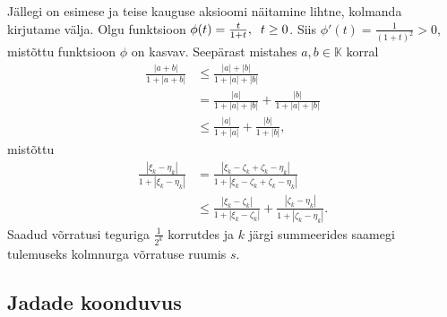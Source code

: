 \documentclass{article}[12pt]
\newcommand{\h}{\hspace{0.2cm}}
\newcommand{\K}{\mathbb{K}}
\theoremstyle{definition}
\theoremstyle{definition}
\theoremstyle{definition}
\theoremstyle{break}
\begin{document}
\begin{enumerate}
	Jällegi on esimese ja teise kauguse aksioomi näitamine lihtne, kolmanda kirjutame välja.
	Olgu funktsioon $\phi(t) = \frac{t}{1+t},\h t\geq 0$. Siis $\phi'(t) = \frac{1}{(1+t)^2}>0$, mistõttu funktsioon $\phi$ on kasvav. 
	Seepärast mistahes $a,b\in\K$ korral
	\begin{align*}
		\frac{ |a+b| }{ 1+|a+b| } &\leq \frac{ |a|+|b| }{ 1+|a|+|b| } \\
		&= \frac{ |a| }{ 1+|a|+|b| } + \frac{ |b| }{ 1+|a|+|b| } \\
		&\leq \frac{ |a| }{ 1+|a| } + \frac{ |b| }{ 1+|b| },
	\end{align*}
	mistõttu
	\begin{align*}
		\frac{ |\xi_k-\eta_k| }{ 1+|\xi_k-\eta_k| } &= \frac{ |\xi_k-\zeta_k+\zeta_k-\eta_k| }{ 1+|\xi_k-\zeta_k+\zeta_k-\eta_k| } \\
		&\leq \frac{ |\xi_k-\zeta_k| }{ 1+|\xi_k-\zeta_k| } + \frac{ |\zeta_k-\eta_k| }{ 1+|\zeta_k-\eta_k| }.
	\end{align*}
	Saadud võrratusi teguriga $\frac{1}{2^k}$ korrutdes ja $k$ järgi summeerides saamegi tulemuseks kolmnurga võrratuse ruumis $s$.
\end{enumerate}

\subsection{Jadade koonduvus}
\end{document}
